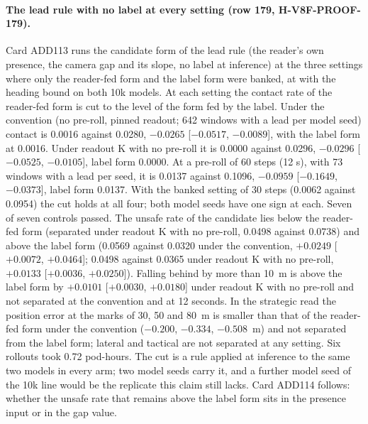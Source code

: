 \paragraph{The lead rule with no label at every setting (row 179, H-V8F-PROOF-179).} Card ADD113 runs the candidate form of the lead rule (the reader's own presence, the camera gap and its slope, no label at inference) at the three settings where only the reader-fed form and the label form were banked, at  with the heading bound on both 10k models. At each setting the contact rate of the reader-fed form is cut to the level of the form fed by the label. Under the convention (no pre-roll, pinned readout; 642 windows with a lead per model seed) contact is 0.0016 against 0.0280, $-0.0265$ [$-0.0517$, $-0.0089$], with the label form at 0.0016. Under readout K with no pre-roll it is 0.0000 against 0.0296, $-0.0296$ [$-0.0525$, $-0.0105$], label form 0.0000. At a pre-roll of 60 steps (12 s), with 73 windows with a lead per seed, it is 0.0137 against 0.1096, $-0.0959$ [$-0.1649$, $-0.0373$], label form 0.0137. With the banked setting of 30 steps (0.0062 against 0.0954) the cut holds at all four; both model seeds have one sign at each. Seven of seven controls passed. The unsafe rate of the candidate lies below the reader-fed form (separated under readout K with no pre-roll, 0.0498 against 0.0738) and above the label form (0.0569 against 0.0320 under the convention, $+0.0249$ [$+0.0072$, $+0.0464$]; 0.0498 against 0.0365 under readout K with no pre-roll, $+0.0133$ [$+0.0036$, $+0.0250$]). Falling behind by more than 10~m is above the label form by $+0.0101$ [$+0.0030$, $+0.0180$] under readout K with no pre-roll and not separated at the convention and at 12 seconds. In the strategic read the position error at the marks of 30, 50 and 80~m is smaller than that of the reader-fed form under the convention ($-0.200$, $-0.334$, $-0.508$~m) and not separated from the label form; lateral and tactical are not separated at any setting. Six rollouts took 0.72 pod-hours. The cut is a rule applied at inference to the same two models in every arm; two model seeds carry it, and a further model seed of the 10k line would be the replicate this claim still lacks. Card ADD114 follows: whether the unsafe rate that remains above the label form sits in the presence input or in the gap value.

